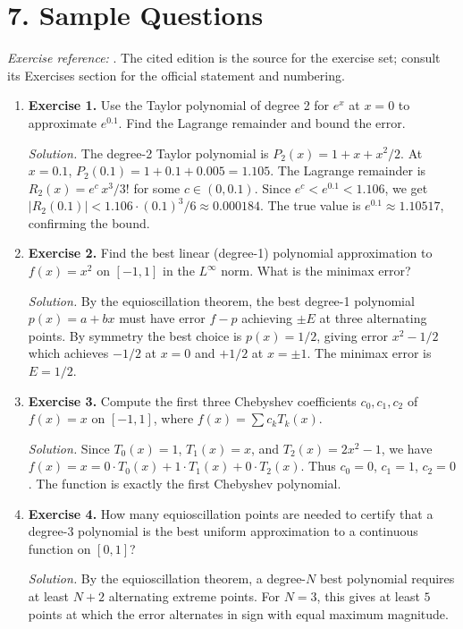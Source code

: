 \section*{7. Sample Questions}
\emph{Exercise reference:} \cite{approximation_theory_ref1}. The cited edition is the source for the exercise set; consult its Exercises section for the official statement and numbering.
\begin{enumerate}[leftmargin=*,itemsep=0.9em]

\item \textbf{Exercise 1.} Use the Taylor polynomial of degree 2 for $e^x$ at $x=0$ to approximate $e^{0.1}$. Find the Lagrange remainder and bound the error.

\emph{Solution.} The degree-2 Taylor polynomial is $P_2(x)=1+x+x^2/2$. At $x=0.1$, $P_2(0.1)=1+0.1+0.005=1.105$. The Lagrange remainder is $R_2(x)=e^c\,x^3/3!$ for some $c\in(0,0.1)$. Since $e^c<e^{0.1}<1.106$, we get $|R_2(0.1)|<1.106\cdot(0.1)^3/6\approx 0.000184$. The true value is $e^{0.1}\approx 1.10517$, confirming the bound.

\item \textbf{Exercise 2.} Find the best linear (degree-1) polynomial approximation to $f(x)=x^2$ on $[-1,1]$ in the $L^\infty$ norm. What is the minimax error?

\emph{Solution.} By the equioscillation theorem, the best degree-1 polynomial $p(x)=a+bx$ must have error $f-p$ achieving $\pm E$ at three alternating points. By symmetry the best choice is $p(x)=1/2$, giving error $x^2-1/2$ which achieves $-1/2$ at $x=0$ and $+1/2$ at $x=\pm 1$. The minimax error is $E=1/2$.

\item \textbf{Exercise 3.} Compute the first three Chebyshev coefficients $c_0,c_1,c_2$ of $f(x)=x$ on $[-1,1]$, where $f(x)=\sum c_k T_k(x)$.

\emph{Solution.} Since $T_0(x)=1$, $T_1(x)=x$, and $T_2(x)=2x^2-1$, we have $f(x)=x=0\cdot T_0(x)+1\cdot T_1(x)+0\cdot T_2(x)$. Thus $c_0=0$, $c_1=1$, $c_2=0$. The function is exactly the first Chebyshev polynomial.

\item \textbf{Exercise 4.} How many equioscillation points are needed to certify that a degree-3 polynomial is the best uniform approximation to a continuous function on $[0,1]$?

\emph{Solution.} By the equioscillation theorem, a degree-$N$ best polynomial requires at least $N+2$ alternating extreme points. For $N=3$, this gives at least $5$ points at which the error alternates in sign with equal maximum magnitude.


\end{enumerate}
